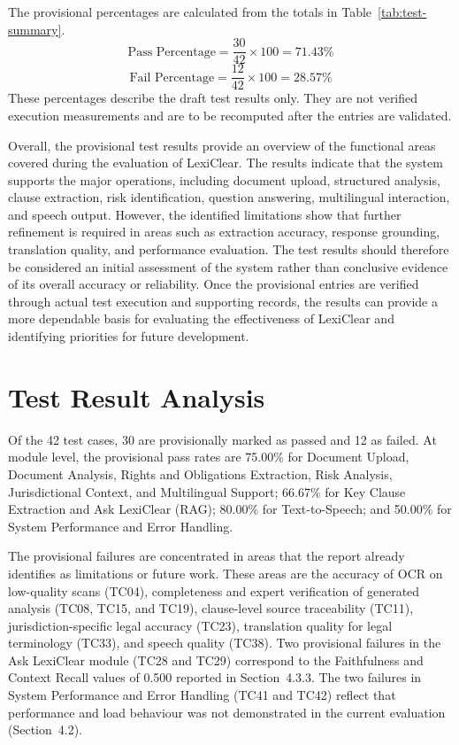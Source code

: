 \documentclass[12pt,a4paper,oneside]{report}
\begin{document}
The provisional percentages are calculated from the totals in Table~\ref{tab:test-summary}.
\begin{equation}
\text{Pass Percentage} = \frac{30}{42}\times 100 = 71.43\%
\end{equation}
\begin{equation}
\text{Fail Percentage} = \frac{12}{42}\times 100 = 28.57\%
\end{equation}
These percentages describe the draft test results only. They are not verified execution measurements and are to be recomputed after the entries are validated.

Overall, the provisional test results provide an overview of the functional areas covered during the evaluation of LexiClear. The results indicate that the system supports the major operations, including document upload, structured analysis, clause extraction, risk identification, question answering, multilingual interaction, and speech output. However, the identified limitations show that further refinement is required in areas such as extraction accuracy, response grounding, translation quality, and performance evaluation. The test results should therefore be considered an initial assessment of the system rather than conclusive evidence of its overall accuracy or reliability. Once the provisional entries are verified through actual test execution and supporting records, the results can provide a more dependable basis for evaluating the effectiveness of LexiClear and identifying priorities for future development.

\section{Test Result Analysis}
Of the 42 test cases, 30 are provisionally marked as passed and 12 as failed. At module level, the provisional pass rates are 75.00\% for Document Upload, Document Analysis, Rights and Obligations Extraction, Risk Analysis, Jurisdictional Context, and Multilingual Support; 66.67\% for Key Clause Extraction and Ask LexiClear (RAG); 80.00\% for Text-to-Speech; and 50.00\% for System Performance and Error Handling.

The provisional failures are concentrated in areas that the report already identifies as limitations or future work. These areas are the accuracy of OCR on low-quality scans (TC04), completeness and expert verification of generated analysis (TC08, TC15, and TC19), clause-level source traceability (TC11), jurisdiction-specific legal accuracy (TC23), translation quality for legal terminology (TC33), and speech quality (TC38). Two provisional failures in the Ask LexiClear module (TC28 and TC29) correspond to the Faithfulness and Context Recall values of 0.500 reported in Section~4.3.3. The two failures in System Performance and Error Handling (TC41 and TC42) reflect that performance and load behaviour was not demonstrated in the current evaluation (Section~4.2).
\end{document}
